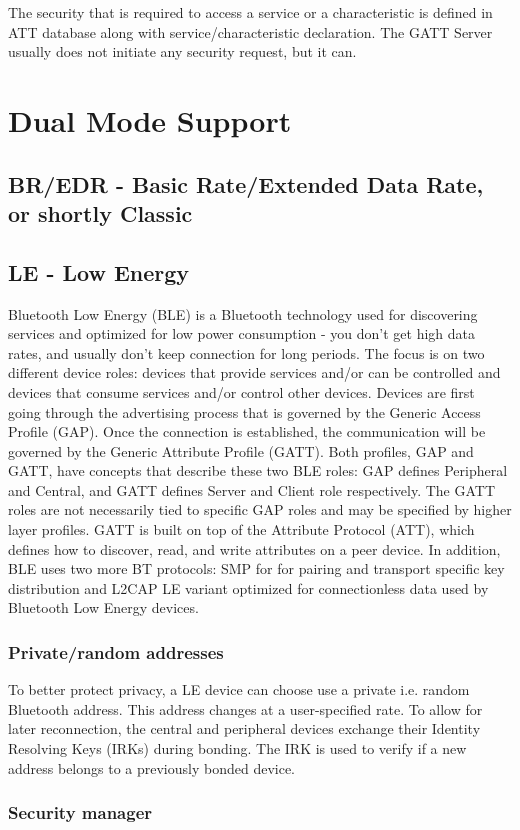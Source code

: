 The security that is required to access a service or a characteristic is defined in ATT database along with service/characteristic declaration. The GATT Server usually does not initiate any security request, but it can. 

\section{Dual Mode Support}
\subsection{BR/EDR - Basic Rate/Extended Data Rate, or shortly Classic}
\subsection{LE - Low Energy}
Bluetooth Low Energy (BLE) is a Bluetooth technology used for discovering services and optimized for low power consumption - you don't get high data rates, and usually don't keep connection for long periods. The focus is on two different device roles:  devices that provide services and/or can be controlled and devices that consume services and/or control other devices. Devices are first going through the advertising process that is governed by the Generic Access Profile (GAP). Once the connection is established, the communication will be governed by the Generic Attribute Profile (GATT). Both profiles, GAP and GATT, have concepts that describe these two BLE roles:  GAP defines Peripheral and Central, and GATT defines Server and Client role respectively. The GATT roles are not necessarily tied to specific GAP roles and may be specified by higher layer profiles. GATT is built on top of the Attribute Protocol (ATT), which defines how to discover, read, and write attributes on a peer device. In addition, BLE uses two more BT protocols: SMP for for pairing and transport specific key distribution and L2CAP LE variant optimized for connectionless data used by Bluetooth Low Energy devices. 


\subsubsection{Private/random addresses}
To better protect privacy, a LE device can choose use a private i.e. random Bluetooth address. This address changes at a user-specified rate. To allow for later reconnection, the central and peripheral devices exchange their Identity Resolving Keys (IRKs) during bonding. The IRK is used to verify if a new address belongs to a previously bonded device.

\subsubsection{Security manager}
\label{section:security_manager}